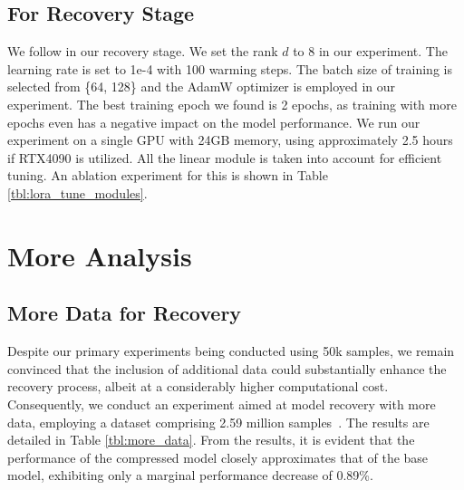 \subsection{For Recovery Stage}
\begin{table}
\vspace{-4mm}
\caption{Ablation: Tuning different modules in the recovery stage }\label{tbl:lora_tune_modules}
\vspace{-2mm}
\end{table}
We follow \cite{hulora} in our recovery stage. We set the rank $d$ to 8 in our experiment. The learning rate is set to 1e-4 with 100 warming steps. The batch size of training is selected from \{64, 128\} and the AdamW optimizer is employed in our experiment. The best training epoch we found is 2 epochs, as training with more epochs even has a negative impact on the model performance. We run our experiment on a single GPU with 24GB memory, using approximately 2.5 hours if RTX4090 is utilized. All the linear module is taken into account for efficient tuning. An ablation experiment for this is shown in Table \ref{tbl:lora_tune_modules}.


\section{More Analysis} 

\subsection{More Data for Recovery} 
Despite our primary experiments being conducted using  50k samples, we remain convinced that the inclusion of additional data could substantially enhance the recovery process, albeit at a considerably higher computational cost. Consequently, we conduct an experiment aimed at model recovery with more data, employing a dataset comprising 2.59 million samples~\cite{wu2023lamini}. The results are detailed in Table \ref{tbl:more_data}. From the results, it is evident that the performance of the compressed model closely approximates that of the base model, exhibiting only a marginal performance decrease of 0.89\%.

